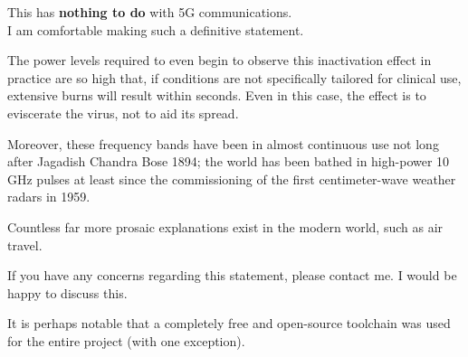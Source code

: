 \documentclass[paper.tex]{subfiles}
\begin{document}
\begin{autem}
	
	{\Large {This has \textbf{nothing to do} with 5G communications.}}\\
	
	I am comfortable making such a definitive statement.
	
	The power levels required to even begin to observe this inactivation effect in practice are so high that, if conditions are not specifically tailored for clinical use, extensive burns will result within seconds. Even in this case, the effect is to eviscerate the virus, not to aid its spread. 
	
	Moreover, these frequency bands have been in almost continuous use not long after Jagadish Chandra Bose 1894; the world has been bathed in high-power 10 GHz pulses at least since the commissioning of the first centimeter-wave weather radars in 1959. 
	
	Countless far more prosaic explanations exist in the modern world, such as air travel.
	
	If you have any concerns regarding this statement, please contact me. I would be happy to discuss this.
	
\end{autem}



%
%
%  
%

\tableofcontents


It is perhaps notable that a completely free and open-source toolchain was used for the entire project (with one exception).
\end{document}
